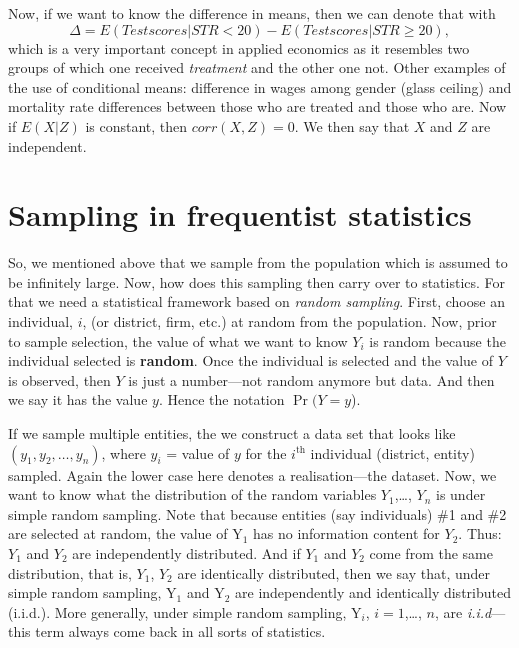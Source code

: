 \documentclass[
]{book}
\begin{document}
Now, if we want to know the difference in means, then we can denote that with
\begin{equation}
\Delta = E(Test scores|STR < 20)-  E(Test scores|STR \geq 20),
\end{equation}
which is a very important concept in applied economics as it resembles two groups of which one received \emph{treatment} and the other one not. Other examples of the use of conditional means: difference in wages among gender (glass ceiling) and mortality rate differences between those who are treated and those who are. Now if \(E(X|Z)\) is constant, then \(corr(X,Z) = 0\). We then say that \(X\) and \(Z\) are independent.

\hypertarget{secssampling}{%
\section{Sampling in frequentist statistics}\label{secssampling}}

So, we mentioned above that we sample from the population which is assumed to be infinitely large. Now, how does this sampling then carry over to statistics. For that we need a statistical framework based on \emph{random sampling}. First, choose an individual, \(i\), (or district, firm, etc.) at random from the population. Now, prior to sample selection, the value of what we want to know \(Y_i\) is random because the individual selected is \textbf{random}. Once the individual is selected and the value of \(Y\) is observed, then \(Y\) is just a number---not random anymore but data. And then we say it has the value \(y\). Hence the notation \(\Pr(Y = y\)).

If we sample multiple entities, the we construct a data set that looks like \((y_1, y_2,\dots, y_n)\), where \(y_i\) = value of \(y\) for the \(i^{\mathrm{th}}\) individual (district, entity) sampled. Again the lower case here denotes a realisation---the dataset. Now, we want to know what the distribution of the random variables \(Y_1\),\ldots, \(Y_n\) is under simple random sampling. Note that because entities (say individuals) \#1 and \#2 are selected at random, the value of Y\(_1\) has no information content for \(Y_2\). Thus: \(Y_1\) and \(Y_2\) are independently distributed. And if \(Y_1\) and \(Y_2\) come from the same distribution, that is, \(Y_1\), \(Y_2\) are identically distributed, then we say that, under simple random sampling, Y\(_1\) and Y\(_2\) are independently and identically distributed (i.i.d.). More generally, under simple random sampling, Y\(_i\), \(i = 1\),\ldots, \(n\), are \emph{i.i.d}---this term always come back in all sorts of statistics.
\end{document}
